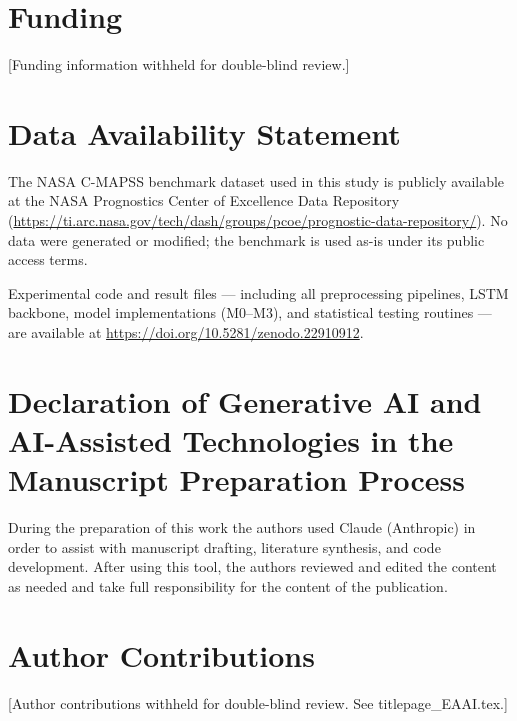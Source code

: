\documentclass[preprint,10pt]{elsarticle}
\begin{document}
\section*{Funding}

[Funding information withheld for double-blind review.]

\section*{Data Availability Statement}

The NASA C-MAPSS benchmark dataset used in this study is publicly available at the NASA Prognostics Center of Excellence Data Repository (\url{https://ti.arc.nasa.gov/tech/dash/groups/pcoe/prognostic-data-repository/}). No data were generated or modified; the benchmark is used as-is under its public access terms.

Experimental code and result files — including all preprocessing pipelines, LSTM backbone, model implementations (M0--M3), and statistical testing routines — are available at \url{https://doi.org/10.5281/zenodo.22910912}.


\section*{Declaration of Generative AI and AI-Assisted Technologies in the
          Manuscript Preparation Process}

During the preparation of this work the authors used Claude (Anthropic) in order
to assist with manuscript drafting, literature synthesis, and code development.
After using this tool, the authors reviewed and edited the content as needed and
take full responsibility for the content of the publication.


\section*{Author Contributions}

[Author contributions withheld for double-blind review. See titlepage\_EAAI.tex.]

\end{document}
